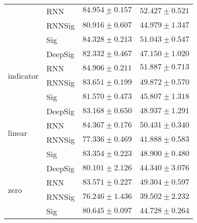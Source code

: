 \begin{tabular}{llll}
                                 & RNN     &  $  \mathbf{ \underline{ 84.954 \pm 0.157 }} $ &               $  \mathbf{ 52.427 \pm 0.521 } $ \\
                                 & RNNSig  &                           $ 80.916 \pm 0.607 $ &                           $ 44.979 \pm 1.347 $ \\
                                 & Sig     &                           $ 84.328 \pm 0.213 $ &                           $ 51.043 \pm 0.547 $ \\
\midrule
\multirow{4}{*}{indicator}       & DeepSig &                           $ 82.332 \pm 0.467 $ &                           $ 47.150 \pm 1.020 $ \\
                                 & RNN     &               $  \mathbf{ 84.906 \pm 0.211 } $ &            $  \underline{ 51.887 \pm 0.713 } $ \\
                                 & RNNSig  &                           $ 83.651 \pm 0.199 $ &                           $ 49.872 \pm 0.570 $ \\
                                 & Sig     &                           $ 81.570 \pm 0.473 $ &                           $ 45.807 \pm 1.318 $ \\
\midrule
\multirow{4}{*}{linear}          & DeepSig &                           $ 83.168 \pm 0.650 $ &                           $ 48.937 \pm 1.291 $ \\
                                 & RNN     &                           $ 84.367 \pm 0.176 $ &                           $ 50.431 \pm 0.340 $ \\
                                 & RNNSig  &                           $ 77.336 \pm 0.469 $ &                           $ 41.888 \pm 0.583 $ \\
                                 & Sig     &                           $ 83.354 \pm 0.223 $ &                           $ 48.900 \pm 0.480 $ \\
\midrule
\multirow{4}{*}{zero}            & DeepSig &                           $ 80.101 \pm 2.126 $ &                           $ 44.340 \pm 3.076 $ \\
                                 & RNN     &                           $ 83.571 \pm 0.227 $ &                           $ 49.304 \pm 0.597 $ \\
                                 & RNNSig  &                           $ 76.246 \pm 1.436 $ &                           $ 39.502 \pm 2.232 $ \\
                                 & Sig     &                           $ 80.645 \pm 0.097 $ &                           $ 44.728 \pm 0.264 $ \\
\bottomrule
\end{tabular}
